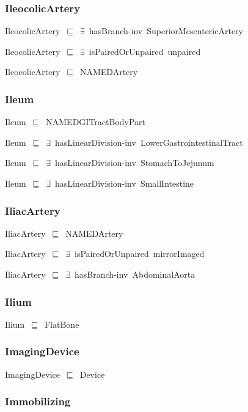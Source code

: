\documentclass{article}
\begin{document}
\subsubsection*{IleocolicArtery}

IleocolicArtery~\ensuremath{\sqsubseteq}~\ensuremath{\exists}~hasBranch-inv~SuperiorMesentericArtery~

IleocolicArtery~\ensuremath{\sqsubseteq}~\ensuremath{\exists}~isPairedOrUnpaired~unpaired~

IleocolicArtery~\ensuremath{\sqsubseteq}~NAMEDArtery~

\subsubsection*{Ileum}

Ileum~\ensuremath{\sqsubseteq}~NAMEDGITractBodyPart~

Ileum~\ensuremath{\sqsubseteq}~\ensuremath{\exists}~hasLinearDivision-inv~LowerGastrointestinalTract~

Ileum~\ensuremath{\sqsubseteq}~\ensuremath{\exists}~hasLinearDivision-inv~StomachToJejunum~

Ileum~\ensuremath{\sqsubseteq}~\ensuremath{\exists}~hasLinearDivision-inv~SmallIntestine~

\subsubsection*{IliacArtery}

IliacArtery~\ensuremath{\sqsubseteq}~NAMEDArtery~

IliacArtery~\ensuremath{\sqsubseteq}~\ensuremath{\exists}~isPairedOrUnpaired~mirrorImaged~

IliacArtery~\ensuremath{\sqsubseteq}~\ensuremath{\exists}~hasBranch-inv~AbdominalAorta~

\subsubsection*{Ilium}

Ilium~\ensuremath{\sqsubseteq}~FlatBone~

\subsubsection*{ImagingDevice}

ImagingDevice~\ensuremath{\sqsubseteq}~Device~

\subsubsection*{Immobilizing}
\end{document}
